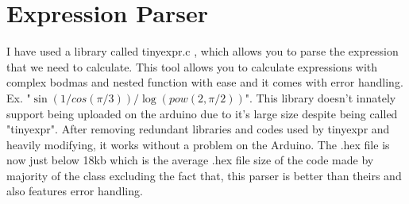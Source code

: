 \documentclass[journal]{IEEEtran}
\begin{document}
	\section{Expression Parser}
	I have used a library called tinyexpr.c , which allows you to parse the expression that we need to calculate. This tool allows you to calculate expressions with complex bodmas and nested function with ease and it comes with error handling. Ex. "$\sin(1/cos(\pi/3))/\log(pow(2, \pi/2))$". This library doesn't innately support being uploaded on the arduino due to it's large size despite being called "tinyexpr". After removing redundant libraries and codes used by tinyexpr and heavily modifying, it works without a problem on the Arduino. The .hex file is now just below 18kb which is the average .hex file size of the code made by majority of the class excluding the fact that, this parser is better than theirs and also features error handling.
\end{document}
